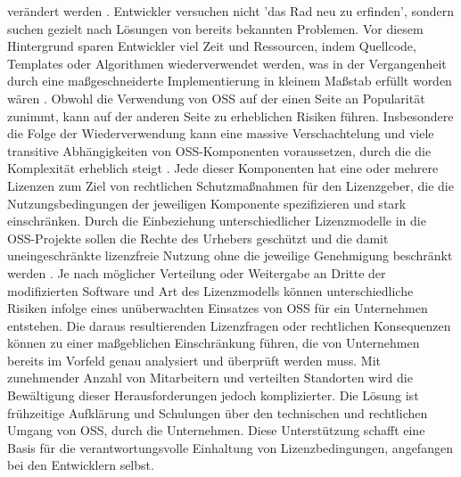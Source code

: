 verändert werden \cite{henkel_code_2010}. Entwickler versuchen nicht 'das Rad neu zu erfinden', sondern suchen gezielt nach Lösungen von bereits bekannten Problemen. Vor diesem Hintergrund sparen Entwickler viel Zeit und Ressourcen, indem Quellcode, Templates oder Algorithmen wiederverwendet werden, was in der Vergangenheit durch eine maßgeschneiderte Implementierung in kleinem Maßstab erfüllt worden wären \cite{spinellis_how_2004}. Obwohl die Verwendung von OSS auf der einen Seite an Popularität zunimmt, kann auf der anderen Seite zu erheblichen Risiken führen. Insbesondere die Folge der Wiederverwendung kann eine massive Verschachtelung und viele transitive Abhängigkeiten von OSS-Komponenten voraussetzen, durch die die Komplexität erheblich steigt \cite{thelen_beschleunigung_2021}. Jede dieser Komponenten hat eine oder mehrere Lizenzen zum Ziel von rechtlichen Schutzmaßnahmen für den Lizenzgeber, die die Nutzungsbedingungen der jeweiligen Komponente spezifizieren und stark einschränken. Durch die Einbeziehung unterschiedlicher Lizenzmodelle in die OSS-Projekte sollen die Rechte des Urhebers geschützt und die damit uneingeschränkte lizenzfreie Nutzung ohne die jeweilige Genehmigung beschränkt werden \cite{widmer_open-source-lizenzen_2006}. Je nach möglicher Verteilung oder Weitergabe an Dritte der modifizierten Software und Art des Lizenzmodells können unterschiedliche Risiken infolge eines unüberwachten Einsatzes von OSS für ein Unternehmen entstehen. Die daraus resultierenden Lizenzfragen oder rechtlichen Konsequenzen können zu einer maßgeblichen Einschränkung führen, die von Unternehmen bereits im Vorfeld genau analysiert und überprüft werden muss. Mit zunehmender Anzahl von Mitarbeitern und verteilten Standorten wird die Bewältigung dieser Herausforderungen jedoch komplizierter. Die Lösung ist frühzeitige Aufklärung und Schulungen über den technischen und rechtlichen Umgang von OSS, durch die Unternehmen. Diese Unterstützung schafft eine Basis für die verantwortungsvolle Einhaltung von Lizenzbedingungen, angefangen bei den Entwicklern selbst. 

